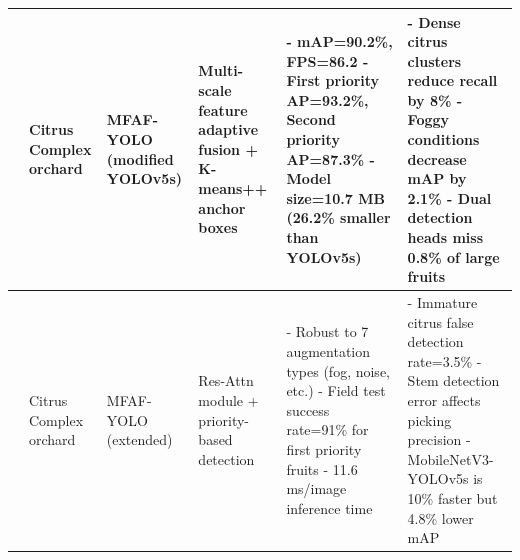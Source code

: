 \documentclass[a4paper,fleqn]{cas-dc}
\begin{document}
\begin{table}[htbp]
\begin{tabular}{@{}p{}p{}p{}p{}p{}p{}@{}}
	\cite{ZHANG2024108836} \newline 2024 & Citrus \newline Complex orchard & MFAF-YOLO (modified YOLOv5s) & Multi-scale feature adaptive fusion + K-means++ anchor boxes & - mAP=90.2\%, FPS=86.2 \newline - First priority AP=93.2\%, Second priority AP=87.3\% \newline - Model size=10.7 MB (26.2\% smaller than YOLOv5s) & - Dense citrus clusters reduce recall by 8\% \newline - Foggy conditions decrease mAP by 2.1\% \newline - Dual detection heads miss 0.8\% of large fruits \\ \midrule
	\cite{LU2024108721} \newline 2024 & Citrus \newline Complex orchard & MFAF-YOLO (extended) & Res-Attn module + priority-based detection & - Robust to 7 augmentation types (fog, noise, etc.) \newline - Field test success rate=91\% for first priority fruits \newline - 11.6 ms/image inference time & - Immature citrus false detection rate=3.5\% \newline - Stem detection error affects picking precision \newline - MobileNetV3-YOLOv5s is 10\% faster but 4.8\% lower mAP \\ \bottomrule


	\end{tabular}
\end{table}
	
\end{document}
